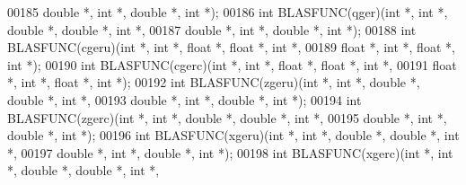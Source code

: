\begin{DoxyCode}
00185            \textcolor{keywordtype}{double} *, \textcolor{keywordtype}{int} *, \textcolor{keywordtype}{double} *, \textcolor{keywordtype}{int} *);
00186 \textcolor{keywordtype}{int} BLASFUNC(qger)(\textcolor{keywordtype}{int} *,    \textcolor{keywordtype}{int} *, \textcolor{keywordtype}{double} *, \textcolor{keywordtype}{double} *, \textcolor{keywordtype}{int} *,
00187            \textcolor{keywordtype}{double} *, \textcolor{keywordtype}{int} *, \textcolor{keywordtype}{double} *, \textcolor{keywordtype}{int} *);
00188 \textcolor{keywordtype}{int} BLASFUNC(cgeru)(\textcolor{keywordtype}{int} *,    \textcolor{keywordtype}{int} *, \textcolor{keywordtype}{float} *,  \textcolor{keywordtype}{float} *, \textcolor{keywordtype}{int} *,
00189             \textcolor{keywordtype}{float} *,  \textcolor{keywordtype}{int} *, \textcolor{keywordtype}{float} *,  \textcolor{keywordtype}{int} *);
00190 \textcolor{keywordtype}{int} BLASFUNC(cgerc)(\textcolor{keywordtype}{int} *,    \textcolor{keywordtype}{int} *, \textcolor{keywordtype}{float} *,  \textcolor{keywordtype}{float} *, \textcolor{keywordtype}{int} *,
00191             \textcolor{keywordtype}{float} *,  \textcolor{keywordtype}{int} *, \textcolor{keywordtype}{float} *,  \textcolor{keywordtype}{int} *);
00192 \textcolor{keywordtype}{int} BLASFUNC(zgeru)(\textcolor{keywordtype}{int} *,    \textcolor{keywordtype}{int} *, \textcolor{keywordtype}{double} *, \textcolor{keywordtype}{double} *, \textcolor{keywordtype}{int} *,
00193             \textcolor{keywordtype}{double} *, \textcolor{keywordtype}{int} *, \textcolor{keywordtype}{double} *, \textcolor{keywordtype}{int} *);
00194 \textcolor{keywordtype}{int} BLASFUNC(zgerc)(\textcolor{keywordtype}{int} *,    \textcolor{keywordtype}{int} *, \textcolor{keywordtype}{double} *, \textcolor{keywordtype}{double} *, \textcolor{keywordtype}{int} *,
00195             \textcolor{keywordtype}{double} *, \textcolor{keywordtype}{int} *, \textcolor{keywordtype}{double} *, \textcolor{keywordtype}{int} *);
00196 \textcolor{keywordtype}{int} BLASFUNC(xgeru)(\textcolor{keywordtype}{int} *,    \textcolor{keywordtype}{int} *, \textcolor{keywordtype}{double} *, \textcolor{keywordtype}{double} *, \textcolor{keywordtype}{int} *,
00197             \textcolor{keywordtype}{double} *, \textcolor{keywordtype}{int} *, \textcolor{keywordtype}{double} *, \textcolor{keywordtype}{int} *);
00198 \textcolor{keywordtype}{int} BLASFUNC(xgerc)(\textcolor{keywordtype}{int} *,    \textcolor{keywordtype}{int} *, \textcolor{keywordtype}{double} *, \textcolor{keywordtype}{double} *, \textcolor{keywordtype}{int} *,

\end{DoxyCode}

